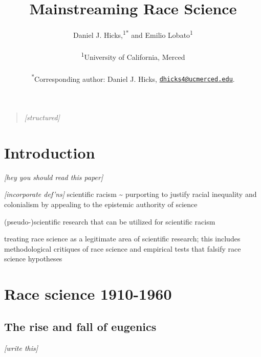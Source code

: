 \documentclass[12pt]{article}
\title{\bf Mainstreaming Race Science}
\author{
Daniel J. Hicks,\textsuperscript{1}\textsuperscript{*}
and Emilio Lobato\textsuperscript{1}
\\
\\
\normalsize{\textsuperscript{1}University of California, Merced}\\
\\
\textsuperscript{*}Corresponding author: Daniel J. Hicks,
\href{mailto:dhicks4@ucmerced.edu}{\nolinkurl{dhicks4@ucmerced.edu}}.
}
\date{}
\providecommand{\tightlist}{%
  \setlength{\itemsep}{0pt}\setlength{\parskip}{0pt}}
\newenvironment{sciabstract}{%
\begin{quote} \singlespacing}
{\end{quote}}
\begin{document}

\baselineskip24pt


\maketitle


\begin{sciabstract}
\emph{{[}structured{]}}
\end{sciabstract}

\hypertarget{introduction}{%
\section*{Introduction}\label{introduction}}

\emph{{[}hey you should read this paper{]}}

\emph{{[}incorporate def'ns{]}} scientific racism \textasciitilde{}
purporting to justify racial inequality and colonialism by appealing to
the epistemic authority of science

\begin{description}
\tightlist
\item[race science]
(pseudo-)scientific research that can be utilized for scientific racism
\item[race science discourse]
treating race science as a legitimate area of scientific research; this
includes methodological critiques of race science and empirical tests
that falsify race science hypotheses
\end{description}

\hypertarget{race-science-1910-1960}{%
\section*{Race science 1910-1960}\label{race-science-1910-1960}}

\hypertarget{the-rise-and-fall-of-eugenics}{%
\subsection*{The rise and fall of
eugenics}\label{the-rise-and-fall-of-eugenics}}

\emph{{[}write this{]}}
\end{document}
